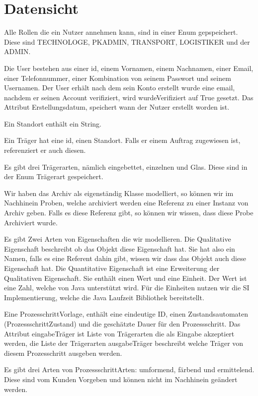 \documentclass[enabledeprecatedfontcommands,fontsize=12pt,paper=a4,twoside]{scrartcl}
\begin{document}
\section{Datensicht}
\label{sec:datensicht}

{

Alle Rollen die ein Nutzer annehmen kann, sind in einer Enum gepspeichert. Diese
sind TECHNOLOGE, PKADMIN, TRANSPORT, LOGISTIKER und der ADMIN.

Die User bestehen aus einer id, einem Vornamen, einem Nachnamen, einer Email,
einer Telefonnummer, einer Kombination von seinem Passwort und seinem Usernamen.
Der User erhält nach dem sein Konto erstellt wurde eine email, nachdem er seinen
Account verifiziert, wird wurdeVerifiziert auf True gesetzt. Das Attribut
Erstellungsdatum, speichert wann der Nutzer erstellt worden ist.

Ein Standort enthält ein String.

Ein Träger hat eine id, einen Standort. Falls er einem Auftrag zugewiesen ist,
referenziert er auch diesen.

Es gibt drei Trägerarten, nämlich eingebettet, einzelnen und Glas. Diese sind in
der Enum Trägerart gespeichert.

Wir haben das Archiv als eigenständig Klasse modelliert, so können wir im
Nachhinein Proben, welche archiviert werden eine Referenz zu einer Instanz von
Archiv geben. Falls es diese Referenz gibt, so können wir wissen, dass diese
Probe Archiviert wurde.

Es gibt Zwei Arten von Eigenschaften die wir modellieren. Die Qualitative
Eigenschaft beschreibt ob das Objekt diese Eigenschaft hat. Sie hat also ein
Namen, falls es eine Referent dahin gibt, wissen wir dass das Objekt auch diese
Eigenschaft hat. Die Quantitative Eigenschaft ist eine Erweiterung der
Qualitativen Eigenschaft. Sie enthält einen Wert und eine Einheit. Der Wert ist
eine Zahl, welche von Java unterstützt wird. Für die Einheiten nutzen wir die SI
Implementierung, welche die Java Laufzeit Bibliothek bereitstellt.

Eine ProzesschrittVorlage, enthält eine eindeutige ID, einen Zustandsautomaten
(ProzessschrittZustand) und die geschätzte Dauer für den Prozessschritt.
Das Attribut eingabeTräger ist Liste von Trägerarten die als Eingabe akzeptiert
werden, die Liste der Trägerarten ausgabeTräger beschreibt welche Träger von
diesem Prozesschritt ausgeben werden.

Es gibt drei Arten von ProzessschrittArten: umformend, färbend und ermittelend.
Diese sind vom Kunden Vorgeben und können nicht im Nachhinein geändert werden.

}
\end{document}
